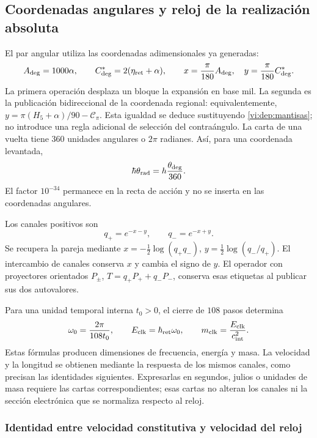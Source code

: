 \subsection{Coordenadas angulares y reloj de la realización absoluta}
\label{vi:dep:reloj}

El par angular utiliza las coordenadas adimensionales ya generadas:
\begin{equation}
 A_{\deg}=1000\alpha,\qquad
 C^*_{\deg}=2(\eta_{\rm ret}+\alpha),\qquad
 x=\frac{\pi}{180}A_{\deg},\quad
 y=\frac{\pi}{180}C^*_{\deg}.
 \label{vi:dep:angulos}
\end{equation}
La primera operación desplaza un bloque la expansión en base mil.
La segunda es la publicación bidireccional de la coordenada regional:
equivalentemente,
\(y=\pi(H_5+\alpha)/90-\mathcal C_\pi\).
Esta igualdad se deduce sustituyendo \eqref{vi:dep:mantisas}; no
introduce una regla adicional de selección del contraángulo.
La carta de una vuelta tiene \(360\) unidades angulares o \(2\pi\)
radianes. Así, para una coordenada levantada,
\[
 \hbar\theta_{\rm rad}
 =h\frac{\theta_{\deg}}{360}.
\]
El factor \(10^{-34}\) permanece en la recta de acción y no se
inserta en las coordenadas angulares.

Los canales positivos son
\[
 q_+=e^{-x-y},\qquad q_-=e^{-x+y}.
\]
Se recupera la pareja mediante
\(x=-\tfrac12\log(q_+q_-)\),
\(y=\tfrac12\log(q_-/q_+)\). El intercambio de canales conserva
\(x\) y cambia el signo de \(y\). El operador con proyectores
orientados \(P_\pm\),
\(T=q_+P_++q_-P_-\), conserva esas etiquetas al publicar sus dos
autovalores.

Para una unidad temporal interna \(t_0>0\), el cierre de \(108\)
pasos determina
\begin{equation}
 \omega_0=\frac{2\pi}{108t_0},\qquad
 E_{\rm clk}=\hbar_{\rm ret}\omega_0,
 \qquad m_{\rm clk}=\frac{E_{\rm clk}}{c_{\rm int}^{2}}.
 \label{vi:dep:reloj-absoluto}
\end{equation}
Estas fórmulas producen dimensiones de frecuencia, energía y masa.
La velocidad y la longitud se obtienen mediante la respuesta de los
mismos canales, como precisan las identidades siguientes. Expresarlas
en segundos, julios o unidades de masa requiere las cartas
correspondientes; esas cartas no alteran los canales ni la sección
electrónica que se normaliza respecto al reloj.

\subsubsection{Identidad entre velocidad constitutiva y velocidad del reloj}


